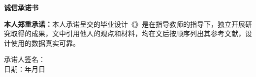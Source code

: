 %
%
%
%
%
%


\pagestyle{originality}
\topskip=0pt

\newcommand{\circled}[2][]{\tikz[baseline=(char.base)]
  {\node[shape = circle, draw, inner sep = 1pt]
  (char) {\phantom{\ifblank{#1}{#2}{#1}}};
  \node at (char.center) {\makebox[0pt][c]{#2}};}}
\robustify{\circled}

\setlength{\parskip}{0.4em}
\renewcommand{\baselinestretch}{1.41}

\vspace*{-6mm}

\begin{center}
  \songti{}\textbf{诚信承诺书}
\end{center}


\textbf{本人郑重承诺：}本人承诺呈交的毕业设计《\thesisTitle》是在指导教师的指导下，独立开展研究取得的成果，文中引用他人的观点和材料，均在文后按顺序列出其参考文献，设计使用的数据真实可靠。

\vspace{60mm}

\begin{flushright}
  承诺人签名：\underline{\hspace{5cm}}\\
  \vspace{5mm}
  日期：\underline{\hspace{2cm}}年\underline{\hspace{1cm}}月\underline{\hspace{1cm}}日
\end{flushright}

\newpage

